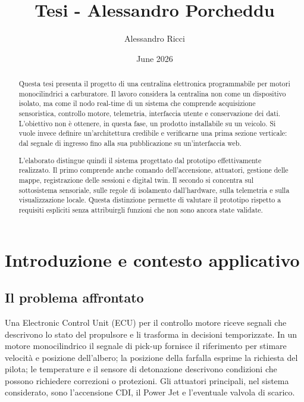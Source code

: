 \documentclass{article}
\title{Tesi - Alessandro Porcheddu}
\author{Alessandro Ricci}
\date{June 2026}
\begin{document}
\maketitle

\begin{abstract}
Questa tesi presenta il progetto di una centralina elettronica programmabile
per motori monocilindrici a carburatore. Il lavoro considera la centralina non
come un dispositivo isolato, ma come il nodo real-time di un sistema che
comprende acquisizione sensoristica, controllo motore, telemetria, interfaccia
utente e conservazione dei dati. L'obiettivo non è ottenere, in questa fase, un
prodotto installabile su un veicolo. Si vuole invece definire un'architettura
credibile e verificarne una prima sezione verticale: dal segnale di ingresso
fino alla sua pubblicazione su un'interfaccia web.

L'elaborato distingue quindi il sistema progettato dal prototipo effettivamente
realizzato. Il primo comprende anche comando dell'accensione, attuatori,
gestione delle mappe, registrazione delle sessioni e digital twin. Il secondo si
concentra sul sottosistema sensoriale, sulle regole di isolamento dall'hardware,
sulla telemetria e sulla visualizzazione locale. Questa distinzione permette di
valutare il prototipo rispetto a requisiti espliciti senza attribuirgli funzioni
che non sono ancora state validate.
\end{abstract}

\tableofcontents

\section{Introduzione e contesto applicativo}
\label{sec:introduzione}

\subsection{Il problema affrontato}

Una Electronic Control Unit (ECU) per il controllo motore riceve segnali che
descrivono lo stato del propulsore e li trasforma in decisioni temporizzate. In
un motore monocilindrico il segnale di pick-up fornisce il riferimento per
stimare velocità e posizione dell'albero; la posizione della farfalla esprime la
richiesta del pilota; le temperature e il sensore di detonazione descrivono
condizioni che possono richiedere correzioni o protezioni. Gli attuatori
principali, nel sistema considerato, sono l'accensione CDI, il Power Jet e
l'eventuale valvola di scarico.
\end{document}
